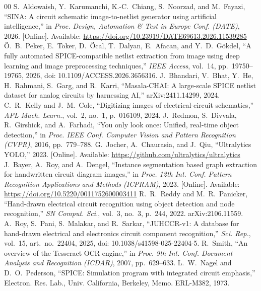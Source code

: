 \documentclass{ieeeaccess}
\begin{document}
\begin{thebibliography}{00}
 S.~Aldowaish, Y.~Karumanchi, K.-C.~Chiang, S.~Noorzad, and M.~Fayazi, ``SINA: A circuit schematic image-to-netlist generator using artificial intelligence,'' in \textit{Proc. Design, Automation \& Test in Europe Conf. (DATE)}, 2026. [Online]. Available: \url{https://doi.org/10.23919/DATE69613.2026.11539285}
 \"{O}.~B.~Peker, E.~Toker, D.~\"{O}cal, T.~Dalyan, E.~Afacan, and Y.~D.~G\"{o}kdel, ``A fully automated SPICE-compatible netlist extraction from image using deep learning and image preprocessing techniques,'' \textit{IEEE Access}, vol.~14, pp.~19750--19765, 2026, doi: 10.1109/ACCESS.2026.3656316.
 J.~Bhandari, V.~Bhat, Y.~He, H.~Rahmani, S.~Garg, and R.~Karri, ``Masala-CHAI: A large-scale SPICE netlist dataset for analog circuits by harnessing AI,'' arXiv:2411.14299, 2024.
 C.~R.~Kelly and J.~M.~Cole, ``Digitizing images of electrical-circuit schematics,'' \textit{APL Mach. Learn.}, vol.~2, no.~1, p.~016109, 2024.
 J.~Redmon, S.~Divvala, R.~Girshick, and A.~Farhadi, ``You only look once: Unified, real-time object detection,'' in \textit{Proc. IEEE Conf. Computer Vision and Pattern Recognition (CVPR)}, 2016, pp.~779--788.
 G.~Jocher, A.~Chaurasia, and J.~Qiu, ``Ultralytics YOLO,'' 2023. [Online]. Available: \url{https://github.com/ultralytics/ultralytics}
 J.~Bayer, A.~Roy, and A.~Dengel, ``Instance segmentation based graph extraction for handwritten circuit diagram images,'' in \textit{Proc. 12th Int. Conf. Pattern Recognition Applications and Methods (ICPRAM)}, 2023. [Online]. Available: \url{https://doi.org/10.5220/0011752600003411}
 R.~R.~Reddy and M.~R.~Panicker, ``Hand-drawn electrical circuit recognition using object detection and node recognition,'' \textit{SN Comput. Sci.}, vol.~3, no.~3, p.~244, 2022. arXiv:2106.11559.
 A.~Roy, S.~Pani, S.~Malakar, and R.~Sarkar, ``JUHCCR-v1: A database for hand-drawn electrical and electronics circuit component recognition,'' \textit{Sci. Rep.}, vol.~15, art.~no.~22404, 2025, doi: 10.1038/s41598-025-22404-5.
 R.~Smith, ``An overview of the Tesseract OCR engine,'' in \textit{Proc. 9th Int. Conf. Document Analysis and Recognition (ICDAR)}, 2007, pp.~629--633.
 L.~W.~Nagel and D.~O.~Pederson, ``SPICE: Simulation program with integrated circuit emphasis,'' Electron. Res. Lab., Univ. California, Berkeley, Memo. ERL-M382, 1973.

\end{thebibliography}
\end{document}
